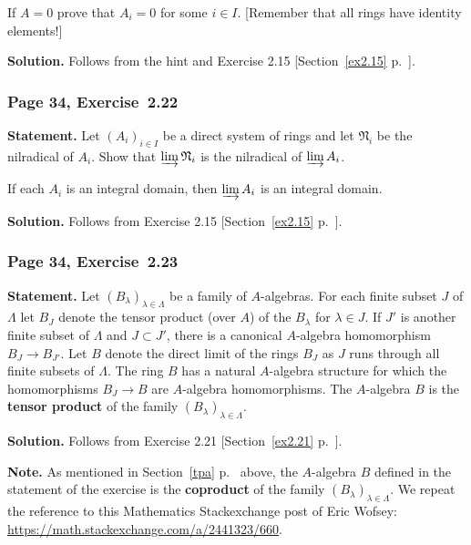 \documentclass[12pt,letterpaper]{article}%
\newcommand{\mf}{\mathfrak}
\newcommand{\NNN}{\mf N}\newcommand{\RRR}{\mf R}
\newcommand{\nn}{\noindent}
\begin{document}
If $A=0$ prove that $A_i=0$ for some $i\in I$. [Remember that all rings have identity elements!]

\nn\textbf{Solution.} Follows from the hint and Exercise 2.15 [Section~\ref{ex2.15} p.~\pageref{ex2.15}]. %

\subsubsection{Page 34, Exercise~2.22}\label{ex2.22}%

\textbf{Statement.} Let $(A_i)_{i\in I}$ be a direct system of rings and let $\NNN_i$ be the nilradical of $A_i$. Show that $\varinjlim\NNN_i$ is the nilradical of $\varinjlim A_i$.

If each $A_i$ is an integral domain, then $\varinjlim A_i$ is an integral domain.

\nn\textbf{Solution.} Follows from Exercise 2.15 [Section~\ref{ex2.15} p.~\pageref{ex2.15}]. %

\subsubsection{Page 34, Exercise~2.23}\label{ex2.23}%

\textbf{Statement.} Let $(B_\lambda)_{\lambda\in\Lambda}$ be a family of $A$-algebras. For each finite subset $J$ of $\Lambda$ let $B_J$ denote the tensor product (over $A$) of the $B_\lambda$ for $\lambda\in J$. If $J'$ is another finite subset of $\Lambda$ and $J\subset J'$, there is a canonical $A$-algebra homomorphism $B_J\to B_{J'}$. Let $B$ denote the direct limit of the rings $B_J$ as $J$ runs through all finite subsets of $\Lambda$. The ring $B$ has a natural $A$-algebra structure for which the homomorphisms $B_J\to B$ are $A$-algebra homomorphisms. The $A$-algebra $B$ is the \textbf{tensor product} of the family $(B_\lambda)_{\lambda\in\Lambda}$.

\nn\textbf{Solution.} Follows from Exercise 2.21 [Section~\ref{ex2.21} p.~\pageref{ex2.21}]. %

\nn\textbf{Note.} As mentioned in Section~\ref{tpa} p.~\pageref{tpa} above, the $A$-algebra $B$ defined in the statement of the exercise is the \textbf{coproduct} of the family $(B_\lambda)_{\lambda\in\Lambda}$. We repeat the reference to this Mathematics Stackexchange post of Eric Wofsey: \href{https://math.stackexchange.com/a/2441323/660}{https://math.stackexchange.com/a/2441323/660}.
\end{document}
